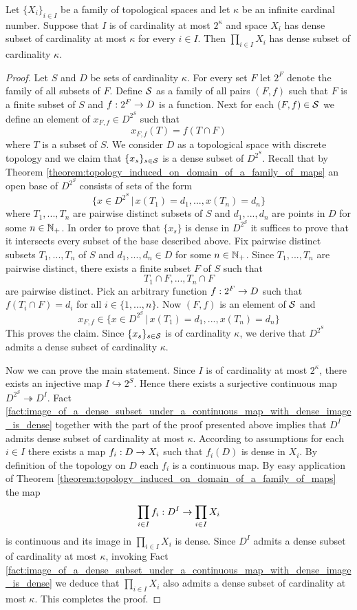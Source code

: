 \begin{theorem}\label{theorem:Hewitt_Marczewski_Pondiczery}
	Let $\{X_i\}_{i \in I}$ be a family of topological spaces and let $\kappa$ be an infinite cardinal number. Suppose that $I$ is of cardinality at most $2^{\kappa}$ and space $X_i$ has dense subset of cardinality at most $\kappa$ for every $i \in I$. Then $\prod_{i \in I}X_i$ has dense subset of cardinality $\kappa$.
\end{theorem}
\begin{proof}
	Let $S$ and $D$ be sets of cardinality $\kappa$. For every set $F$ let $2^F$ denote the family of all subsets of $F$. Define ${\mathcal S}$ as a family of all pairs $(F,f)$ such that $F$ is a finite subset of $S$ and $f:2^F \rightarrow D$ is a function. Next for each $(F,f) \in {\mathcal S}$ we define an element of $x_{F,f} \in D^{2^S}$ such that
	$$x_{F,f}(T) = f(T\cap F)$$
	where $T$ is a subset of $S$. We consider $D$ as a topological space with discrete topology and we claim that $\{x_s\}_{s\in {\mathcal S}}$ is a dense subset of $D^{2^S}$. Recall that by Theorem \ref{theorem:topology_induced_on_domain_of_a_family_of_maps} an open base of $D^{2^S}$ consists of sets of the form
	$$\big\{x\in D^{2^S}\,\big|\,x(T_1)=d_1,...,x(T_n)=d_n\big\}$$
	where $T_1,...,T_n$ are pairwise distinct subsets of $S$ and $d_1,...,d_n$ are points in $D$ for some $n\in {\mathbb N}_+$. In order to prove that $\{x_s\}$ is dense in $D^{2^S}$ it suffices to prove that it intersects every subset of the base described above. Fix pairwise distinct subsets $T_1,...,T_n$ of $S$ and $d_1,...,d_n\in D$ for some $n\in {\mathbb N}_+$. Since $T_1,...,T_n$ are pairwise distinct, there exists a finite subset $F$ of $S$ such that
	$$T_1\cap F,...,T_n\cap F$$
	are pairwise distinct. Pick an arbitrary function $f:2^F \rightarrow D$ such that $f(T_i\cap F) = d_i$ for all $i \in \{1,...,n\}$. Now $(F,f)$ is an element of ${\mathcal S}$ and
	$$x_{F,f} \in \big\{x\in D^{2^S}\,\big|\,x(T_1)=d_1,...,x(T_n)=d_n\big\}$$
	This proves the claim. Since $\{x_s\}_{s\in {\mathcal S}}$ is of cardinality $\kappa$, we derive that $D^{2^S}$ admits a dense subset of cardinality $\kappa$.

	Now we can prove the main statement. Since $I$ is of cardinality at most $2^{\kappa}$, there exists an injective map $I \hookrightarrow 2^S$. Hence there exists a surjective continuous map $D^{2^S} \twoheadrightarrow D^I$. Fact \ref{fact:image_of_a_dense_subset_under_a_continuous_map_with_dense_image_is_dense} together with the part of the proof presented above implies that $D^I$ admits dense subset of cardinality at most $\kappa$. According to assumptions for each $i \in I$ there exists a map $f_i:D\rightarrow X_i$ such that $f_i(D)$ is dense in $X_i$. By definition of the topology on $D$ each $f_i$ is a continuous map. By easy application of Theorem \ref{theorem:topology_induced_on_domain_of_a_family_of_maps} the map
	$$\prod_{i\in I}f_i:D^{I} \rightarrow \prod_{i \in I}X_i$$
	is continuous and its image in $\prod_{i \in I}X_i$ is dense. Since $D^I$ admits a dense subset of cardinality at most $\kappa$, invoking Fact \ref{fact:image_of_a_dense_subset_under_a_continuous_map_with_dense_image_is_dense} we deduce that $\prod_{i \in I}X_i$ also admits a dense subset of cardinality at most $\kappa$. This completes the proof.
\end{proof}
